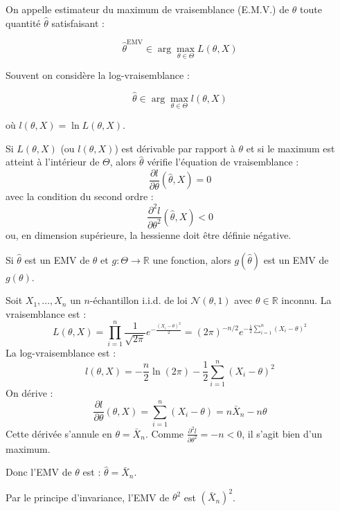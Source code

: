 
\smallskip

\begin{mdframed}
\begin{definition}
On appelle estimateur du maximum de vraisemblance (E.M.V.) de $\theta$ toute quantité $\hat{\theta}$ satisfaisant :

$$
\hat{\theta}^{\text{EMV}} \in \arg \max_{\theta \in \Theta} L(\theta,X)
$$

Souvent on considère la log-vraisemblance :

$$
\hat{\theta} \in \arg \max_{\theta \in \Theta} l(\theta,X)
$$

où $l(\theta,X) = \ln L(\theta,X)$.
\end{definition}
\end{mdframed}

\begin{proposition}
Si $L(\theta, X)$ (ou $l(\theta,X)$) est dérivable par rapport à $\theta$ et si le maximum est atteint à l'intérieur de $\Theta$, alors $\hat{\theta}$ vérifie l'équation de vraisemblance :
$$
\frac{\partial l}{\partial \theta}(\hat{\theta}, X) = 0
$$
avec la condition du second ordre :
$$
\frac{\partial^2 l}{\partial \theta^2}(\hat{\theta}, X) < 0
$$
ou, en dimension supérieure, la hessienne doit être définie négative.
\end{proposition}

\begin{theoreme}
Si $\hat{\theta}$ est un EMV de $\theta$ et $g : \Theta \to \mathbb{R}$ une fonction, alors $g(\hat{\theta})$ est un EMV de $g(\theta)$.
\end{theoreme}

\begin{exemple}
Soit $X_1, \ldots, X_n$ un $n$-échantillon i.i.d. de loi $\mathcal{N}(\theta, 1)$ avec $\theta \in \mathbb{R}$ inconnu.
La vraisemblance est :
$$
L(\theta, X) = \prod_{i=1}^{n} \frac{1}{\sqrt{2\pi}} e^{-\frac{(X_i-\theta)^2}{2}} = (2\pi)^{-n/2} e^{-\frac{1}{2}\sum_{i=1}^{n}(X_i-\theta)^2}
$$
La log-vraisemblance est :
$$
l(\theta, X) = -\frac{n}{2}\ln(2\pi) - \frac{1}{2}\sum_{i=1}^{n}(X_i-\theta)^2
$$
On dérive :
$$
\frac{\partial l}{\partial \theta}(\theta, X) = \sum_{i=1}^{n}(X_i-\theta) = n\bar{X}_n - n\theta
$$
Cette dérivée s'annule en $\theta = \bar{X}_n$. Comme $\frac{\partial^2 l}{\partial \theta^2} = -n < 0$, il s'agit bien d'un maximum.

Donc l'EMV de $\theta$ est : $\hat{\theta} = \bar{X}_n$.

Par le principe d'invariance, l'EMV de $\theta^2$ est $(\bar{X}_n)^2$.
\end{exemple}

